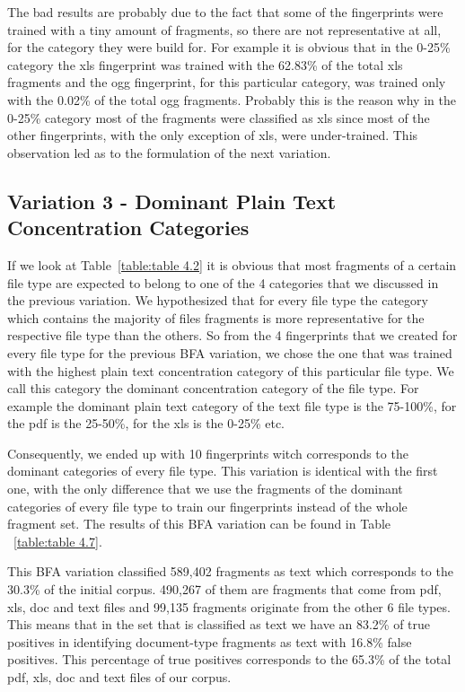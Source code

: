  The bad results are probably due to the fact that some of the fingerprints were trained with a tiny amount of fragments, so there are not representative at all, for the category they were build for. For example it is obvious that in the 0-25\% category the xls fingerprint was trained with the 62.83\% of the total xls fragments and the ogg fingerprint, for this particular category, was trained only with the 0.02\% of the total ogg fragments. Probably this is the reason why in the 0-25\% category most of the fragments were classified as xls since most of the other fingerprints, with the only exception of xls, were under-trained. This observation led as to the formulation of the next variation.




\subsection{Variation 3 - Dominant Plain Text Concentration Categories}

If we look at Table~\ref{table:table 4.2} it is obvious that most fragments of a certain file type are expected to belong to one of the 4 categories that we discussed in the previous variation. We hypothesized that for every file type the category which contains the majority of files  fragments is more representative for the respective file type than the others. So from the 4 fingerprints that we created for every file type for the previous BFA variation, we chose the one that was trained with the highest plain text concentration category of this particular file type. We call this category the dominant concentration category of the file type. For example the dominant plain text category of the text file type is the 75-100\%, for the pdf is the 25-50\%, for the xls is the 0-25\% etc. 

Consequently, we ended up with 10 fingerprints witch corresponds to the dominant categories of every file type. This variation is identical with the first one, with the only difference that we use the fragments of the dominant categories of every file type to train our fingerprints instead of the whole fragment set. The results of this BFA variation can be found in Table ~\ref{table:table 4.7}.

This BFA variation classified 589,402 fragments as text which corresponds to the 30.3\% of the initial corpus. 490,267 of them are fragments that come from pdf, xls, doc and text files and 99,135 fragments originate from the other 6 file types. This means that in the set that is classified as text we have an 83.2\% of true positives in identifying document-type fragments as text with 16.8\% false positives. This percentage of true positives corresponds to the 65.3\% of the total pdf, xls, doc and text files of our corpus.



